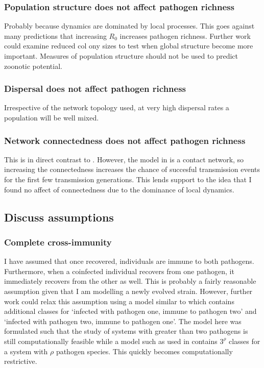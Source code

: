 \subsubsection{Population structure does not affect pathogen richness}

Probably because dynamics are dominated by local processes.
This goes against many predictions that increasing $R_0$ increases pathogen richness.
Further work could examine reduced col  ony sizes to test when global structure become more important.
Measures of population structure should not be used to predict zoonotic potential.

\subsubsection{Dispersal does not affect pathogen richness}

Irrespective of the network topology used, at very high dispersal rates a population will be well mixed.


\subsubsection{Network connectedness does not affect pathogen richness}

This is in direct contrast to \cite{campos2006pathogen}. 
However, the model in \cite{campos2006pathogen} is a contact network, so increasing the connectedness increases the chance of succesful transmission events for the first few transmission generations.
This lends support to the idea that I found no affect of connectedness due to the dominance of local dynamics.
 


\subsection{Discuss assumptions}

\subsubsection{Complete cross-immunity}

I have assumed that once recovered, individuals are immune to both pathogens. 
Furthermore, when a coinfected individual recovers from one pathogen, it immediately recovers from the other as well.
This is probably a fairly reasonable assumption given that I am modelling a newly evolved strain.
However, further work could relax this assumption using a model similar to \cite{poletto2015characterising} which contains additional classes for `infected with pathogen one, immune to pathogen two' and `infected with pathogen two, immune to pathogen one'.
The model here was formulated such that the study of systems with greater than two pathogens is still computationally feasible while a model such as used in \cite{poletto2015characterising} contains $3^\rho$ classes for a system with $\rho$ pathogen species.
This quickly becomes computationally restrictive.

